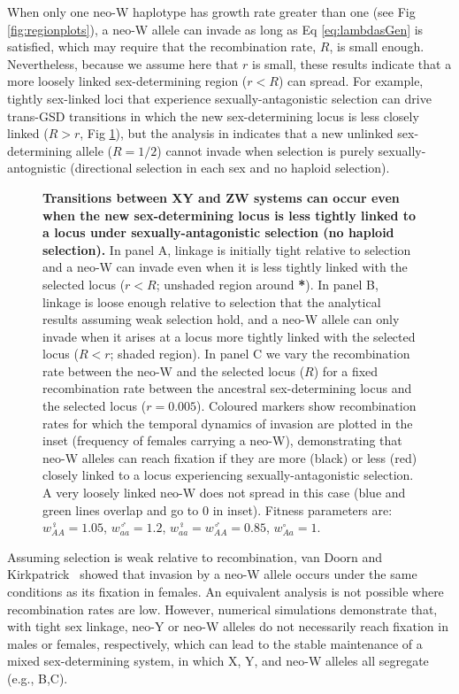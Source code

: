 \documentclass[10pt,letterpaper]{article}
\begin{document}
When only one neo-W haplotype has growth rate greater than one (see Fig \ref{fig:regionplots}), a neo-W allele can invade as long as Eq \eqref{eq:lambdasGen} is satisfied, which may require that the recombination rate, $R$, is small enough.
Nevertheless, because we assume here that $r$ is small, these results indicate that a more loosely linked sex-determining region ($r<R$) can spread.
For example, tightly sex-linked loci that experience sexually-antagonistic selection can drive trans-GSD transitions in which the new sex-determining locus is less closely linked ($R>r$, Fig \ref{fig:SexAntagTighter}), but the analysis in  indicates that a new unlinked sex-determining allele ($R=1/2$) cannot invade when selection is purely sexually-antognistic (directional selection in each sex and no haploid selection).

\begin{figure}[!h]
\centering
\caption{
{\bf Transitions between XY and ZW systems can occur even when the new sex-determining locus is less tightly linked to a locus under sexually-antagonistic selection (no haploid selection).}
In panel A, linkage is initially tight relative to selection and a neo-W can invade even when it is less tightly linked with the selected locus ($r<R$; unshaded region around \textbf{*}).
In panel B, linkage is loose enough relative to selection that the analytical results assuming weak selection hold, and a neo-W allele can only invade when it arises at a locus more tightly linked with the selected locus ($R<r$; shaded region).
In panel C we vary the recombination rate between the neo-W and the selected locus ($R$) for a fixed recombination rate between the ancestral sex-determining locus and the selected locus ($r=0.005$). 
Coloured markers show recombination rates for which the temporal dynamics of invasion are plotted in the inset (frequency of females carrying a neo-W), demonstrating that neo-W alleles can reach fixation if they are more (black) or less (red) closely linked to a locus experiencing sexually-antagonistic selection. 
A very loosely linked neo-W does not spread in this case (blue and green lines overlap and go to 0 in inset). 
Fitness parameters are: $w_{AA}^\female = 1.05$, $w_{aa}^\male = 1.2$, $w_{aa}^\female = w_{AA}^\male = 0.85$, $w_{Aa}^\circ = 1$.
}
\label{fig:SexAntagTighter}
\end{figure}

Assuming selection is weak relative to recombination, van Doorn and Kirkpatrick~\cite{vanDoorn:2010hu} showed that invasion by a neo-W allele occurs under the same conditions as its fixation in females.
An equivalent analysis is not possible where recombination rates are low. 
However, numerical simulations demonstrate that, with tight sex linkage, neo-Y or neo-W alleles do not necessarily reach fixation in males or females, respectively, which can lead to the stable maintenance of a mixed sex-determining system, in which X, Y, and neo-W alleles all segregate (e.g., B,C).
\end{document}
